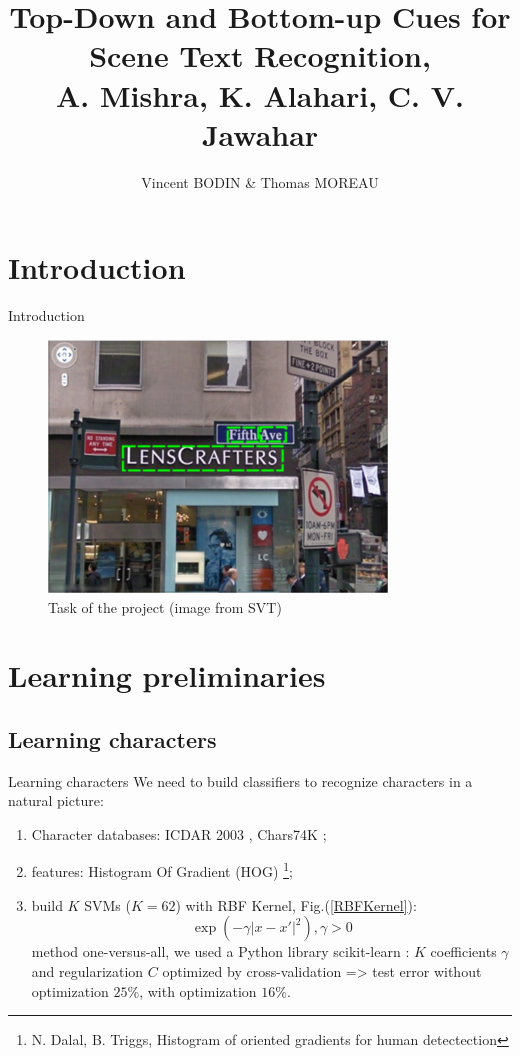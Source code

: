 \documentclass[handout]{beamer}
\title{\textbf{Top-Down and Bottom-up Cues for Scene Text Recognition, \\
 A. Mishra, K. Alahari, C. V. Jawahar}}
\author{Vincent BODIN \& Thomas MOREAU}
\begin{document}
\renewcommand{\contentsname}{Sommaire}


\begin{frame}[allowframebreaks]
\titlepage
\end{frame}


\section*{Introduction}


\begin{frame}{Introduction}
\begin{figure}%
\includegraphics[width=9cm]{figures/intro.png}%
\caption{Task of the project (image from SVT)}%
\label{}%
\end{figure}
\end{frame}




\section{Learning preliminaries}

\subsection{Learning characters}

\begin{frame}{Learning characters}
We need to build classifiers to recognize characters in a natural picture:
\begin{enumerate}
	\item Character databases: ICDAR 2003 \cite{ICDARchar}, Chars74K \cite{Char74K};
	
	\item features: Histogram Of Gradient (HOG) \cite{Dal2005}\footnote{N. Dalal, B. Triggs, Histogram of oriented gradients for human detectection};
	
	\item build $K$ SVMs ($K = 62$) with RBF Kernel, Fig.(\ref{RBFKernel}):
	\begin{equation}
	\exp(-\gamma |x-x'|^2), \gamma > 0
	\label{eq:}
	\end{equation}
	method one-versus-all, we used a Python library scikit-learn \cite{scikit}: $K$ coefficients $\gamma$ and regularization $C$ optimized by cross-validation => test error without optimization $25\%$, with optimization $16\%$.
\end{enumerate}
\end{frame}
\end{document}
